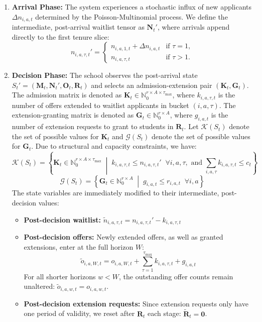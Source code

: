 \documentclass{article}
\newcommand{\Set}[1]{\left\{ #1 \right\}}
\begin{document}
\begin{enumerate}
    \item \textbf{Arrival Phase:} The system experiences a stochastic influx of new applicants $\Delta n_{i, a, t}$ determined by the Poisson-Multinomial process. We define the intermediate, post-arrival waitlist tensor as $\mathbf{N}_t'$, where arrivals append directly to the first tenure slice:
    \[
    n_{i, a, \tau, t}' = 
    \begin{cases} 
    n_{i, a, 1, t} + \Delta n_{i, a, t} & \text{if } \tau = 1, \\
    n_{i, a, \tau, t} & \text{if } \tau > 1.
    \end{cases}
    \]
    
    \item \textbf{Decision Phase:} The school observes the post-arrival state $S_t' = (\mathbf{M}_t, \mathbf{N}_t', \mathbf{O}_t, \mathbf{R}_t)$ and selects an admission-extension pair $(\mathbf{K}_t, \mathbf{G}_t)$. The admission matrix is denoted as $\mathbf{K}_t \in \mathbb{N}_0^{r \times A \times \tau_{\max}}$, where $k_{i, a, \tau, t}$ is the number of offers extended to waitlist applicants in bucket $(i, a, \tau)$. The extension-granting matrix is denoted as $\mathbf{G}_t \in \mathbb{N}_0^{r \times A}$, where $g_{i, a, t}$ is the number of extension requests to grant to students in $\mathbf{R}_t$. Let $\mathcal{K}(S_t)$ denote the set of possible values for $\mathbf{K}_t$ and $\mathcal{G}(S_t)$ denote the set of possible values for $\mathbf{G}_t$. Due to structural and capacity constraints, we have:
    \[
    \mathcal{K}(S_t) = \Set{\mathbf{K}_t \in \mathbb{N}_0^{r \times A \times \tau_{\max}} \;\middle|\; k_{i, a, \tau, t} \leq n_{i, a, \tau, t}' \;\; \forall i, a, \tau, \text{ and } \sum_{i, a, \tau} k_{i, a, \tau, t} \leq c_t}
    \]
    \[
        \mathcal{G}(S_t) = \Set{\mathbf{G}_t \in \mathbb{N}_0^{r \times A} \; \middle| \; g_{i, a, t} \leq r_{i, a, t} \;\; \forall i, a}
    \]
    The state variables are immediately modified to their intermediate, post-decision values:
    \begin{itemize}
        \item \textbf{Post-decision waitlist:} $\tilde{n}_{i, a, \tau, t} = n_{i, a, \tau, t}' - k_{i, a, \tau, t}$
        \item \textbf{Post-decision offers:} Newly extended offers, as well as granted extensions, enter at the full horizon $W$:
        \[
        \tilde{o}_{i, a, W, t} = o_{i, a, W, t} + \sum_{\tau=1}^{\tau_{\max}} k_{i, a, \tau, t} + g_{i, a, t}
        \]
        For all shorter horizons $w < W$, the outstanding offer counts remain unaltered: $\tilde{o}_{i, a, w, t} = o_{i, a, w, t}$.
        \item \textbf{Post-decision extension requests:} Since extension requests only have one period of validity, we reset after $\mathbf{R}_t$ each stage: $\tilde{\mathbf{R}}_t = \mathbf{0}$.
    \end{itemize}


\end{enumerate}
\end{document}
